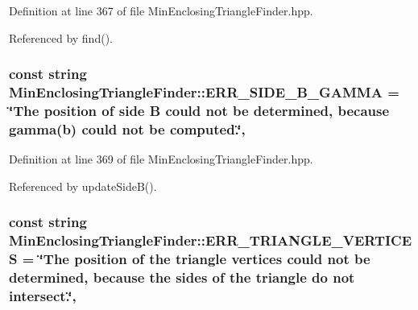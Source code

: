 Definition at line 367 of file Min\-Enclosing\-Triangle\-Finder.\-hpp.



Referenced by find().

\hypertarget{classmultiscale_1_1MinEnclosingTriangleFinder_a84e5ff8e5fec501f3d3b9ac6ee2416ee}{
\subsubsection[{E\-R\-R\-\_\-\-S\-I\-D\-E\-\_\-\-B\-\_\-\-G\-A\-M\-M\-A}]{\setlength{\rightskip}{0pt plus 5cm}const string Min\-Enclosing\-Triangle\-Finder\-::\-E\-R\-R\-\_\-\-S\-I\-D\-E\-\_\-\-B\-\_\-\-G\-A\-M\-M\-A = \char`\"{}The position of side B could not be determined, because {\bf gamma}({\bf b}) could not be computed.\char`\"{}\hspace{0.3cm}{\ttfamily [static]}, {\ttfamily [private]}}}\label{classmultiscale_1_1MinEnclosingTriangleFinder_a84e5ff8e5fec501f3d3b9ac6ee2416ee}


Definition at line 369 of file Min\-Enclosing\-Triangle\-Finder.\-hpp.



Referenced by update\-Side\-B().

\hypertarget{classmultiscale_1_1MinEnclosingTriangleFinder_aefe21c593b616438f9fa3591625322aa}{
\subsubsection[{E\-R\-R\-\_\-\-T\-R\-I\-A\-N\-G\-L\-E\-\_\-\-V\-E\-R\-T\-I\-C\-E\-S}]{\setlength{\rightskip}{0pt plus 5cm}const string Min\-Enclosing\-Triangle\-Finder\-::\-E\-R\-R\-\_\-\-T\-R\-I\-A\-N\-G\-L\-E\-\_\-\-V\-E\-R\-T\-I\-C\-E\-S = \char`\"{}The position of the triangle vertices could not be determined, because the sides of the triangle do not intersect.\char`\"{}\hspace{0.3cm}{\ttfamily [static]}, {\ttfamily [private]}}}\label{classmultiscale_1_1MinEnclosingTriangleFinder_aefe21c593b616438f9fa3591625322aa}


